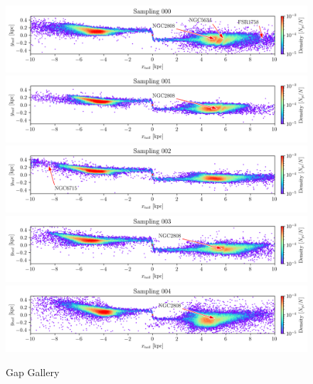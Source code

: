 \documentclass[]{aa}
\begin{document}
\begin{appendix}
    \begin{figure}
      \centering
      \includegraphics[width=\linewidth]{gallery_of_gaps_monte-carlo-000.png}
      \includegraphics[width=\linewidth]{gallery_of_gaps_monte-carlo-001.png}
      \includegraphics[width=\linewidth]{gallery_of_gaps_monte-carlo-002.png}
      \includegraphics[width=\linewidth]{gallery_of_gaps_monte-carlo-003.png}
      \includegraphics[width=\linewidth]{gallery_of_gaps_monte-carlo-004.png}
      \caption{Gap Gallery}
      \label{fig:TailCoordinates}
    \end{figure}    



\end{appendix}
\end{document}
